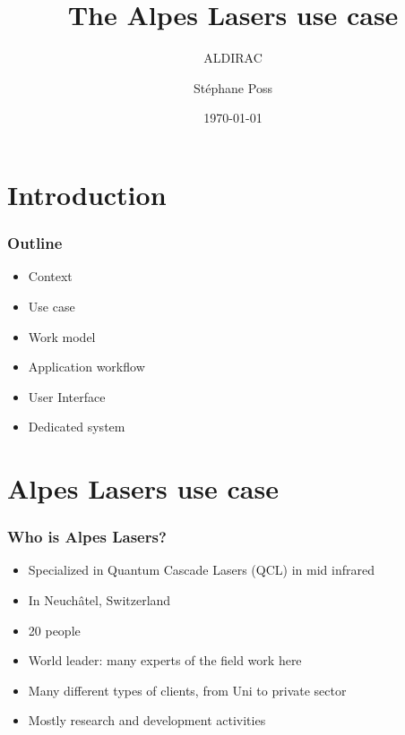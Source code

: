 \documentclass[14pt]{beamer}
\title{The Alpes Lasers use case}
\subtitle{ALDIRAC}
\author{St\'ephane Poss}
\date{\today}
\begin{document}
\begin{frame}[plain]
\titlepage
\end{frame}

\section{Introduction}
\begin{frame}
\frametitle{Outline}
\begin{itemize}
\setlength{\itemindent}{-1.2em}
\item Context
\item Use case
\item Work model
\item Application workflow
\item User Interface
\item Dedicated system
\end{itemize}
\end{frame}

\section{Alpes Lasers use case}
\begin{frame}
\frametitle{Who is Alpes Lasers?}
\begin{itemize}
\setlength{\itemindent}{-1.2em}
\item Specialized in Quantum Cascade Lasers (QCL) in mid infrared
\item In Neuch\^atel, Switzerland
\item 20 people
\item \alert{World leader}: many experts of the field work here
\item Many different types of clients, from Uni to private sector
\item Mostly research and development activities
\end{itemize}
\end{frame}
{
\begin{frame}[plain]
~
\end{frame}
}
\end{document}
